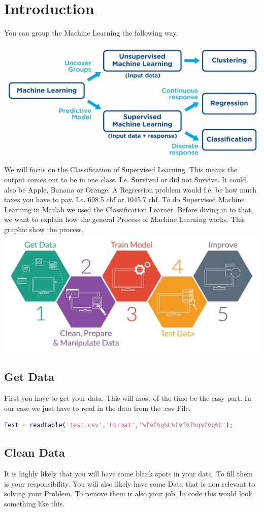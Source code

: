 \documentclass[
   10.5pt,
   invert-title=true,
   titlepage=false,
   titleimage-ratio=13,
   class=article
]{bfhpub}				%
\begin{document}
\section*{Introduction}
You can group the Machine Learning the following way. 
\includegraphics[width=80mm\\]{overview}
\newline
We will focus on the Classification of Supervised Learning. This means the output comes out to be in one class. I.e. Survived or did not Survive. It could also be Apple, Banana or Orange. A Regression problem would f.e. be how much taxes you have to pay. I.e. 698.5 chf or 1045.7 chf. To do Supervised Machine Learning in Matlab we used the Classification Learner. Before diving in to that, we want to explain how the general Process of Machine Learning works. This graphic show the process.
\includegraphics[width=70mm\\]{process}
\subsection*{Get Data}
First you have to get your data. This will most of the time be the easy part. In our case we just have to read in the data from the .csv File.
\begin{lstlisting}[language=Matlab]
Test = readtable('test.csv','Format','%f%f%q%C%f%f%f%q%f%q%C');
\end{lstlisting}

\subsection*{Clean Data}
It is highly likely that you will have some blank spots in your data. To fill them is your responsibility. You will also likely have some Data that is non relevant to solving your Problem. To remove them is also your job. In code this would look something like this.
\end{document}
